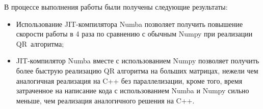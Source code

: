 \documentclass[12pt, fleqn]{article}
\begin{document}
В процессе выполнения работы были получены следующие результаты:
\begin{itemize}
\item Использование JIT-компилятора Numba позволяет получить повышение скорости работы в 4 раза по сравнению с обычным Numpy при реализации QR~алгоритма;
\item JIT-компилятор Numba вместе с использованием Numpy позволяет получить более быструю реализацию QR алгоритма на больших матрицах, нежели чем аналогичная реализация на C++ без параллелизации, кроме того, время затраченное на написание кода с использованием Numba и Numpy сильно меньше, чем реализация аналогичного решения на C++.
\end{itemize}

\def\BibUrl#1.{}\def\BibAnnote#1.{}


\end{document}
